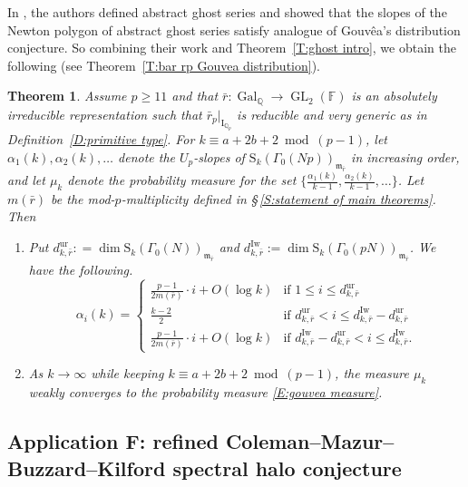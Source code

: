 \documentclass[12pt]{amsart}
\newtheorem{theorem}[subsection]{Theorem}
\theoremstyle{definition}
\numberwithin{equation}{subsection}
\def\gothm{\mathfrak{m}}
\def\FF{\mathbb{F}}
\def\QQ{\mathbb{Q}}
\def\rmI{\mathrm{I}}
\def\rmS{\mathrm{S}}
\DeclareMathOperator{\Gal}{Gal}
\DeclareMathOperator{\GL}{GL}
\newcommand{\Iw}{\mathrm{Iw}}
\newcommand{\ur}{\mathrm{ur}}
\begin{document}
In \cite{bergdall-pollack3}, the authors defined abstract ghost series and showed that the slopes of the Newton polygon of abstract ghost series satisfy analogue of Gouv\^ea's distribution conjecture. So combining their work and Theorem~\ref{T:ghost intro}, we obtain the following (see Theorem~\ref{T:bar rp Gouvea distribution}).
\begin{theorem}
Assume $p \geq 11$ and that $\bar r: \Gal_{\QQ} \to \GL_2(\FF)$ is an absolutely irreducible representation such that $\bar r_p|_{\rmI_{\QQ_p}}$ is reducible and very generic as in Definition~\ref{D:primitive type}.  For $k \equiv a+2b+2 \bmod(p-1)$, let $\alpha_1(k), \alpha_2(k), \dots$ denote the $U_p$-slopes of $\rmS_k(\Gamma_0(Np))_{\gothm_{\bar r}}$ in increasing order, and let $\mu_k$ denote the probability measure for the set $\{\frac{\alpha_1(k)}{k-1},\frac{\alpha_2(k)}{k-1},\dots \big\}$. Let $m(\bar r)$ be the mod-$p$-multiplicity defined in \S\,\ref{S:statement of main theorems}.
Then
\begin{enumerate}
\item 
Put $d_{k, \bar r}^\ur : =\dim \rmS_k(\Gamma_0(N))_{\gothm_{\bar r}}$ and $d_{k, \bar r}^\Iw:= \dim \rmS_k(\Gamma_0(pN))_{\gothm_{\bar r}}$.
We have the following.
$$
\alpha_i(k) = \begin{cases}
\frac{p-1}{2m(\bar r)} \cdot i + O(\log k) & \textrm{if }1 \leq i \leq d_{k, \bar r}^\ur
\\
\frac{k-2}2 & \textrm{if } d_{k, \bar r}^\ur < i \leq d_{k, \bar r}^\Iw - d_{k, \bar r}^\ur
\\
\frac{p-1}{2m(\bar r)} \cdot i + O(\log k) & \textrm{if }d_{k, \bar r}^\Iw - d_{k, \bar r}^\ur < i \leq d_{k, \bar r}^\Iw.
\end{cases}
$$
\item As $k \to \infty$ while keeping $k \equiv a+2b+2 \bmod(p-1)$, the measure $\mu_k$ weakly converges to the probability measure \eqref{E:gouvea measure}.
\end{enumerate}
\end{theorem}

\subsection{Application F: refined Coleman--Mazur--Buzzard--Kilford spectral halo conjecture}
\label{S:application F refined halo}
\end{document}
